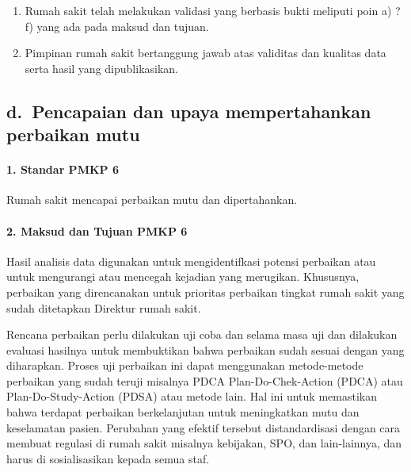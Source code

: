 \documentclass[
]{book}
\providecommand{\tightlist}{%
  \setlength{\itemsep}{0pt}\setlength{\parskip}{0pt}}
\begin{document}
\begin{enumerate}
\def\labelenumi{\alph{enumi}.}
\tightlist
\item
  Rumah sakit telah melakukan validasi yang berbasis bukti meliputi poin a) ? f) yang ada pada maksud dan tujuan.
\item
  Pimpinan rumah sakit bertanggung jawab atas validitas dan kualitas data serta hasil yang dipublikasikan.
\end{enumerate}

\hypertarget{d.-pencapaian-dan-upaya-mempertahankan-perbaikan-mutu}{%
\subsection*{d.~Pencapaian dan upaya mempertahankan perbaikan mutu}\label{d.-pencapaian-dan-upaya-mempertahankan-perbaikan-mutu}}

\hypertarget{standar-pmkp-6}{%
\paragraph*{1. Standar PMKP 6}\label{standar-pmkp-6}}

Rumah sakit mencapai perbaikan mutu dan dipertahankan.

\hypertarget{maksud-dan-tujuan-pmkp-6}{%
\paragraph*{2. Maksud dan Tujuan PMKP 6}\label{maksud-dan-tujuan-pmkp-6}}

Hasil analisis data digunakan untuk mengidentifkasi potensi perbaikan atau untuk mengurangi atau mencegah kejadian yang merugikan. Khususnya, perbaikan yang direncanakan untuk prioritas perbaikan tingkat rumah sakit yang sudah ditetapkan Direktur rumah sakit.

Rencana perbaikan perlu dilakukan uji coba dan selama masa uji dan dilakukan evaluasi hasilnya untuk membuktikan bahwa perbaikan sudah sesuai dengan yang diharapkan. Proses uji perbaikan ini dapat menggunakan metode-metode perbaikan yang sudah teruji misalnya PDCA Plan-Do-Chek-Action (PDCA) atau Plan-Do-Study-Action (PDSA) atau metode lain. Hal ini untuk memastikan bahwa terdapat perbaikan berkelanjutan untuk meningkatkan mutu dan keselamatan pasien. Perubahan yang efektif tersebut distandardisasi dengan cara membuat regulasi di rumah sakit misalnya kebijakan, SPO, dan lain-lainnya, dan harus di sosialisasikan kepada semua staf.
\end{document}
